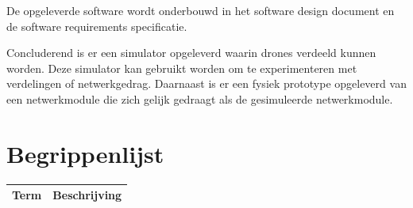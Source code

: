 \documentclass[a4paper, 11pt, oneside]{report}
\begin{document}
De opgeleverde software wordt onderbouwd in het software design document en de software requirements specificatie.

Concluderend is er een simulator opgeleverd waarin drones verdeeld kunnen worden.
Deze simulator kan gebruikt worden om te experimenteren met verdelingen of netwerkgedrag.
Daarnaast is er een fysiek prototype opgeleverd van een netwerkmodule die zich gelijk gedraagt als de gesimuleerde netwerkmodule.   

\tableofcontents
\clearpage
\chapter*{Begrippenlijst}
\label{inleiding:begrippenlijst}

\begin{longtable}[c]{|l|l|}
	\hline
	\rowcolor[HTML]{9B9B9B} 
	Term & Beschrijving \\ \hline
	\endhead


\end{longtable}
\end{document}
